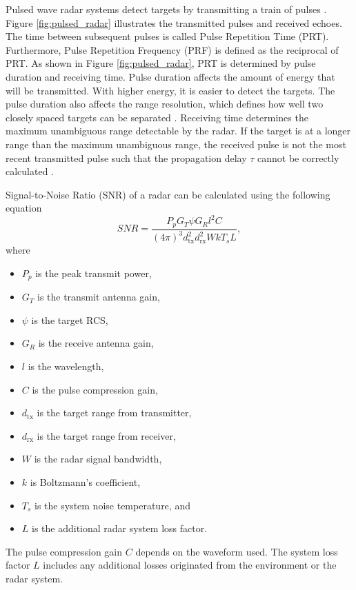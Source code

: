 \documentclass[english, 12pt, a4paper, elec, utf8, a-1b, online]{aaltothesis}
\numberwithin{equation}{section}
\begin{document}
Pulsed wave radar systems detect targets by transmitting a train of pulses \cite{Mahafza2015}.
Figure \ref{fig:pulsed_radar} illustrates the transmitted pulses and received echoes.
The time between subsequent pulses is called Pulse Repetition Time (PRT). 
Furthermore, Pulse Repetition Frequency (PRF) is defined as the reciprocal of PRT.
As shown in Figure \ref{fig:pulsed_radar}, PRT is determined by pulse duration and receiving time.
Pulse duration affects the amount of energy that will be transmitted.
With higher energy, it is easier to detect the targets.
The pulse duration also affects the range resolution, which defines how well two closely spaced targets can be separated \cite{Curry2011}.
Receiving time determines the maximum unambiguous range detectable by the radar.
If the target is at a longer range than the maximum unambiguous range, the received pulse is not the most recent transmitted pulse such that the propagation delay $\tau$ cannot be correctly calculated \cite{Curry2011}.

Signal-to-Noise Ratio (SNR) of a radar can be calculated using the following equation \cite{Curry2011}
\begin{equation} \label{eq:radar_snr}
SNR = \frac{P_p G_T \psi G_R l^2 C}{(4\pi)^3 d_\text{tx}^2 d_\text{rx}^2 W k T_s L},
\end{equation}
where
\begin{itemize}
    \item $P_p$ is the peak transmit power,
    \item $G_T$ is the transmit antenna gain,
    \item $\psi$ is the target RCS,
    \item $G_R$ is the receive antenna gain,
    \item $l$ is the wavelength,
    \item $C$ is the pulse compression gain,
    \item $d_\text{tx}$ is the target range from transmitter,
    \item $d_\text{rx}$ is the target range from receiver,
    \item $W$ is the radar signal bandwidth,
    \item $k$ is Boltzmann's coefficient,
    \item $T_s$ is the system noise temperature, and 
    \item $L$ is the additional radar system loss factor.
\end{itemize}
The pulse compression gain $C$ depends on the waveform used.
The system loss factor $L$ includes any additional losses originated from the environment or the radar system.
\end{document}
